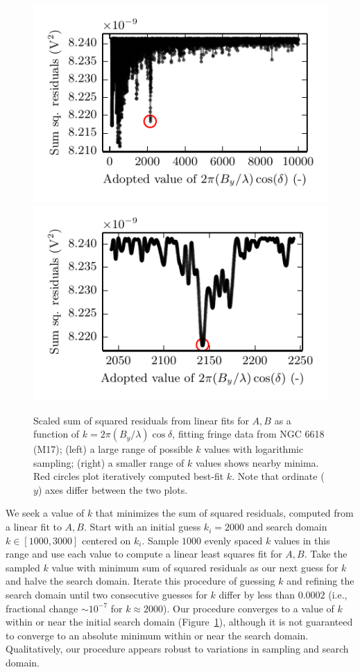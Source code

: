 \documentclass[10pt]{article}
\begin{document}
\begin{figure}[!ht]
    \centering
    \includegraphics{plots_fitting/M17_dec_fits_lsq_logk.pdf}
    \includegraphics{plots_fitting/M17_dec_fits_lsq.pdf}
    \caption{Scaled sum of squared residuals from linear fits for $A,B$ as a function of $k = 2\pi \left(B_y/\lambda\right) \cos\delta$, fitting fringe data from NGC 6618 (M17); (left) a large range of possible $k$ values with logarithmic sampling; (right) a smaller range of $k$ values shows nearby minima.  Red circles plot iteratively computed best-fit $k$.  Note that ordinate ($y$) axes differ between the two plots.}
    \label{fig:declsq}
\end{figure}

We seek a value of $k$ that minimizes the sum of squared residuals, computed from a linear fit to $A,B$.  Start with an initial guess $k_i = 2000$ and search domain $k\in[1000, 3000]$ centered on $k_i$.  Sample $1000$ evenly spaced $k$ values in this range and use each value to compute a linear least squares fit for $A,B$.  Take the sampled $k$ value with minimum sum of squared residuals as our next guess for $k$ and halve the search domain.  Iterate this procedure of guessing $k$ and refining the search domain until two consecutive guesses for $k$ differ by less than $0.0002$ (i.e., fractional change $\sim 10^{-7}$ for $k \approx 2000$).  Our procedure converges to a value of $k$ within or near the initial search domain (Figure~\ref{fig:declsq}), although it is not guaranteed to converge to an absolute minimum within or near the search domain.  Qualitatively, our procedure appears robust to variations in sampling and search domain.
\end{document}
